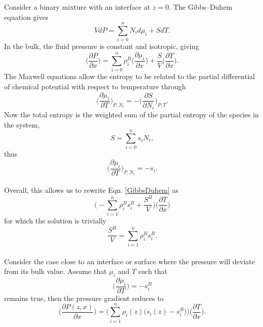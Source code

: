 Consider a binary mixture with an interface at $z=0$.
The Gibbs--Duhem equation gives
\begin{equation}
V dP = \sum_{i=0}^{n} N_{i} d\mu_{i} + S dT.
\end{equation}
In the bulk, the fluid pressure is constant and isotropic, giving
\begin{equation}
\label{GibbsDuhem}
\bigg(\frac{\partial P}{\partial x}\bigg) = \sum_{i=0}^{n} \rho_{i}^{B} \bigg(\frac{\partial \mu_{i}}{\partial x}\bigg) + \frac{S}{V} \bigg(\frac{\partial T}{\partial x}\bigg).
\end{equation}
The Maxwell equations allow the entropy to be related to the partial differential of chemical potential with respect to temperature through
\begin{equation}
\bigg( \frac{\partial\mu_{i}}{\partial T} \bigg)_{P,N_{i}} = - \bigg(\frac{\partial S}{\partial N_{i}}\bigg)_{P,T}.
\end{equation}
Now the total entropy is the weighted sum of the partial entropy of the species in the system, 
\begin{equation}
S = \sum_{i=0}^{n}s_{i}N_{i},
\end{equation}
thus
\begin{equation}
\bigg( \frac{\partial\mu_{i}}{\partial T} \bigg)_{P,N_{i}} = - s_{i}.
\end{equation}
\\
Overall, this allows us to rewrite Eqn. \ref{GibbsDuhem} as
\begin{equation}
\bigg( - \sum_{i=1}^{n}\rho_{i}^{B}s_{i}^{B}+\frac{S^{B}}{V}\bigg)\bigg(\frac{\partial T}{\partial x}\bigg)
\end{equation}
for which the solution is trivially 
\begin{equation}
\frac{S^{B}}{V} = \sum_{i=1}^{n}\rho_{i}^{B}s_{i}^{B}.
\end{equation}
\\
Consider the case close to an interface or surface where the pressure will deviate from its bulk value.
Assume that $\mu_{i}$ and $T$ such that
\begin{equation}
\bigg(\frac{\partial \mu_{i}}{\partial T}\bigg) = - s_{i}^{B}
\end{equation}
remains true, then the pressure gradient reduces to
\begin{equation}
\bigg(\frac{\partial P(z,x)}{\partial x}\bigg) = \Bigg(\sum_{i=1}^{n}\rho_{i}(z)\Big(s_{i}(z)-s_{i}^{B}\Big)\Bigg)\bigg(\frac{\partial T}{\partial x}\bigg).
\end{equation}

